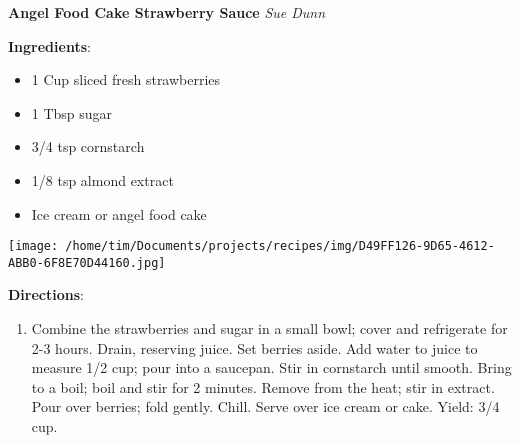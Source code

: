 \documentclass[11pt, twoside, openany]{book}
\begin{document}
\noindent\begin{minipage}[t]{\linewidth}%
{\Large\textbf{Angel Food Cake Strawberry Sauce}} \label{angel-food-cake-strawberry-sauce}\hfill\textit{Sue Dunn}\\
\noindent\begin{minipage}[t]{0.78\linewidth}%
\textbf{Ingredients}:\vspace{-3mm}
\begin{multicols}{2}
\begin{itemize}\setlength\itemsep{-1mm}
\item 1 Cup sliced fresh strawberries
\item 1 Tbsp sugar
\item 3/4 tsp cornstarch
\item 1/8 tsp almond extract
\item Ice cream or angel food cake
\end{itemize}
\end{multicols}
\end{minipage}
\noindent\begin{minipage}[t]{0.18\linewidth}
\centering \strut\vspace*{-\baselineskip}\newline
\texttt{[image: /home/tim/Documents/projects/recipes/img/D49FF126-9D65-4612-ABB0-6F8E70D44160.jpg]}\\
\end{minipage}\vspace{3mm}
\textbf{Directions}:
\vspace{-3mm}\begin{enumerate}\setlength\itemsep{-1mm}
\item Combine the strawberries and sugar in a small bowl; cover and refrigerate for 2-3 hours. Drain, reserving juice. Set berries aside. Add water to juice to measure 1/2 cup; pour into a saucepan. Stir in cornstarch until smooth. Bring to a boil; boil and stir for 2 minutes. Remove from the heat; stir in extract. Pour over berries; fold gently. Chill. Serve over ice cream or cake. Yield: 3/4 cup.
\end{enumerate}
\end{minipage}\vspace{8mm}
\end{document}
